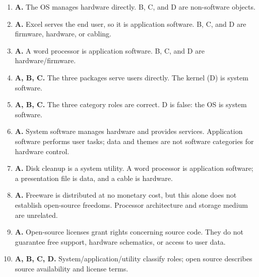 \begin{enumerate}[label=\textbf{Q\arabic*.}, leftmargin=*]
\item \textbf{A.} The OS manages hardware directly. B, C, and D are non-software objects.
\item \textbf{A.} Excel serves the end user, so it is application software. B, C, and D are firmware, hardware, or cabling.
\item \textbf{A.} A word processor is application software. B, C, and D are hardware/firmware.
\item \textbf{A, B, C.} The three packages serve users directly. The kernel (D) is system software.
\item \textbf{A, B, C.} The three category roles are correct. D is false: the OS is system software.
\item \textbf{A.} System software manages hardware and provides services. Application software performs user tasks; data and themes are not software categories for hardware control.

\item \textbf{A.} Disk cleanup is a system utility. A word processor is application software; a presentation file is data, and a cable is hardware.

\item \textbf{A.} Freeware is distributed at no monetary cost, but this alone does not establish open-source freedoms. Processor architecture and storage medium are unrelated.

\item \textbf{A.} Open-source licenses grant rights concerning source code. They do not guarantee free support, hardware schematics, or access to user data.

\item \textbf{A, B, C, D.} System/application/utility classify roles; open source describes source availability and license terms.

\end{enumerate}
